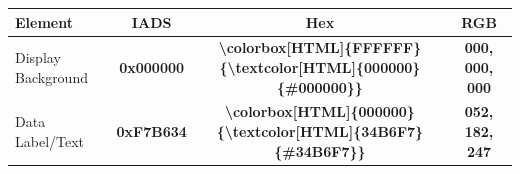 \documentclass[
]{book}
\begin{document}
\begin{enumerate}
\begin{enumerate}
    \begin{longtable}[]{@{}lccc@{}}
    \toprule
    \begin{minipage}[b]{0.30\columnwidth}\raggedright
    Element\strut
    \end{minipage} & \begin{minipage}[b]{0.19\columnwidth}\centering
    IADS\strut
    \end{minipage} & \begin{minipage}[b]{0.19\columnwidth}\centering
    Hex\strut
    \end{minipage} & \begin{minipage}[b]{0.21\columnwidth}\centering
    RGB\strut
    \end{minipage}\tabularnewline
    \midrule
    \endhead
    \begin{minipage}[t]{0.30\columnwidth}\raggedright
    Display Background\strut
    \end{minipage} & \begin{minipage}[t]{0.19\columnwidth}\centering
    \textbf{\colorbox[HTML]{FFFFFF}{\textcolor[HTML]{000000}{0x000000}}}\strut
    \end{minipage} & \begin{minipage}[t]{0.19\columnwidth}\centering
    \textbf{\textbackslash colorbox{[}HTML{]}\{FFFFFF\}\{\textbackslash textcolor{[}HTML{]}\{000000\}\{\#000000\}\}}\strut
    \end{minipage} & \begin{minipage}[t]{0.21\columnwidth}\centering
    \textbf{\colorbox[HTML]{FFFFFF}{\textcolor[HTML]{000000}{000, 000, 000}}}\strut
    \end{minipage}\tabularnewline
    \begin{minipage}[t]{0.30\columnwidth}\raggedright
    Data Label/Text\strut
    \end{minipage} & \begin{minipage}[t]{0.19\columnwidth}\centering
    \textbf{\colorbox[HTML]{000000}{\textcolor[HTML]{34B6F7}{0xF7B634}}}\strut
    \end{minipage} & \begin{minipage}[t]{0.19\columnwidth}\centering
    \textbf{\textbackslash colorbox{[}HTML{]}\{000000\}\{\textbackslash textcolor{[}HTML{]}\{34B6F7\}\{\#34B6F7\}\}}\strut
    \end{minipage} & \begin{minipage}[t]{0.21\columnwidth}\centering
    \textbf{\colorbox[HTML]{000000}{\textcolor[HTML]{34B6F7}{052, 182, 247}}}\strut
    \end{minipage}\tabularnewline

\end{longtable}
\end{enumerate}
\end{enumerate}
\end{document}
